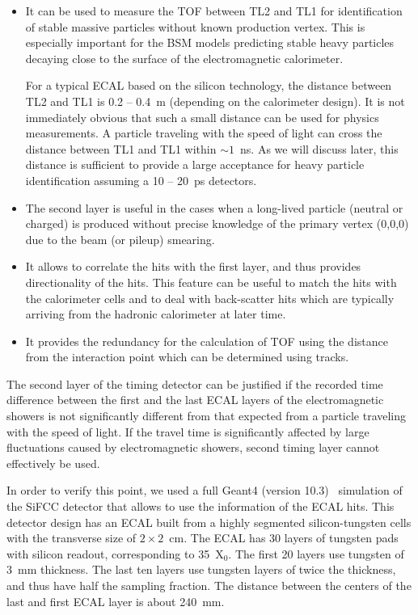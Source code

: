 \documentclass[final,1p,11pt]{elsarticle}
\begin{document}
\begin{itemize}

\item
It can be used to measure the TOF between TL2 and TL1 for identification
of stable massive particles without known production vertex. This is especially important
for the BSM models predicting stable heavy particles
decaying close to the surface of the electromagnetic calorimeter.     

For a typical ECAL based on the silicon technology, the distance between TL2 and TL1 is  0.2 -- 0.4~m (depending on the calorimeter design).
It is not immediately obvious that such a small distance can be used for physics measurements. 
A particle traveling with the speed of light can cross the distance between TL1 and TL1 within $\sim 1$~ns.
As we will discuss later, this distance is sufficient to provide a large acceptance 
for heavy particle identification  assuming a 10 -- 20~ps detectors. 

\item
The second layer is  useful in the cases when a long-lived particle (neutral or charged) is produced without precise knowledge of the primary vertex (0,0,0)
due to the beam (or pileup) smearing. 

\item
It allows to correlate the hits with the first layer, and thus provides directionality of the hits. This feature can be useful to
match the hits with the calorimeter cells and to deal with back-scatter 
hits which are typically arriving from the hadronic calorimeter at later time. 

\item
It provides the redundancy for the calculation of TOF using the distance from the interaction point which can be determined using tracks.

\end{itemize}


The second layer of the timing detector can be justified if the recorded time difference between
the first and the last ECAL  
layers of the electromagnetic showers is not significantly different from that expected from a particle traveling with the speed of light.
If the travel time is significantly affected by large fluctuations caused by electromagnetic showers,    
second timing layer cannot effectively be used.

In order to verify this point, we used a full Geant4 (version 10.3)~\cite{Allison2016186} simulation 
of the SiFCC detector \cite{Chekanov:2016ppq} that allows to use the information of the ECAL hits.
This detector design has an ECAL built from a highly segmented silicon-tungsten cells with the transverse size of $2 \times 2$~cm.
The ECAL has 30 layers of tungsten pads with silicon readout,
corresponding to 35~X$_{0}$. The first 20 layers use tungsten of 3~mm thickness.
The last ten layers use tungsten layers of
twice the thickness, and thus have half the  sampling fraction.  
The distance between the centers of the last and first ECAL layer is about 240~mm.  
\end{document}
